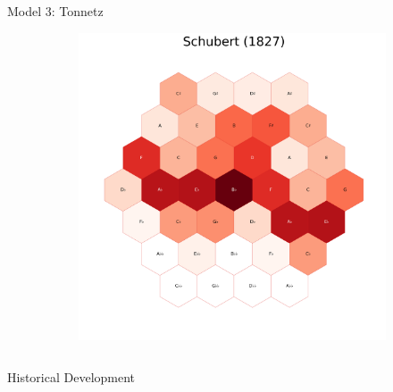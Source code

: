 \documentclass[final]{beamer}
\begin{document}
\begin{frame}[t]
\begin{minipage}[t][.56\textheight][t]{\textwidth}
\begin{columns}[t]
\begin{column}{0.3\textwidth}
\begin{block}{Model 3: Tonnetz}
\begin{figure}
\begin{subfigure}{\textwidth}
				\end{subfigure}
				\begin{subfigure}{\textwidth} %
					\includegraphics[width=\textwidth]{img/schubert_tonnetz.png}
				\end{subfigure}
			\end{figure}
      \end{block}

    \end{column}
  \end{columns}

\end{minipage}

\begin{minipage}[t][.3\textheight][t]{\textwidth}

	\begin{columns}
		\begin{column}{.6\textwidth}
		  \begin{block}{Historical Development}


\end{block}
\end{column}
\end{columns}
\end{minipage}
\end{frame}
\end{document}
